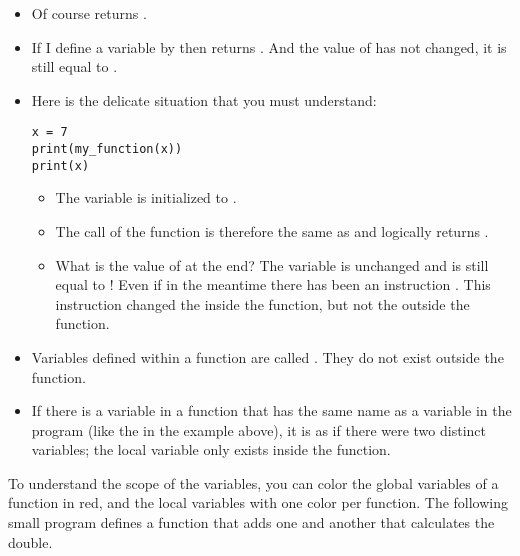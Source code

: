 \documentclass[11pt,class=report,crop=false]{standalone}
\begin{document}
\begin{itemize}
  \item Of course  returns .
  
  \item If I define a variable by  then  returns . And the value of  has not changed, it is still equal to .
  
  \item Here is the delicate situation that you must understand:
\begin{center}
\begin{lstlisting}
x = 7
print(my_function(x))
print(x)
\end{lstlisting}
\end{center}
  \begin{itemize}
    \item The variable  is initialized to .
    
    \item The call of the function  is therefore the same as 
      and logically returns .
     
    
    \item What is the value of  at the end? The variable  is unchanged and is still equal to ! Even if in the meantime there has been an instruction . This instruction changed the  inside the function, but not the  outside the function.
\end{itemize}   
\end{itemize} 
 
\bigskip

\begin{itemize}
  \item Variables defined within a function are called 
. 
They do not exist outside the function.
  
  \item If there is a variable in a function that has the same name as a variable in the program (like the  in the example above), it is as if there were two distinct variables; the local variable only exists inside the function.
  
\end{itemize}


To understand the scope of the variables, you can color the global variables of a function in red, and the local variables with one color per function.
The following small program defines a function that adds one and another that calculates the double.
\end{document}
